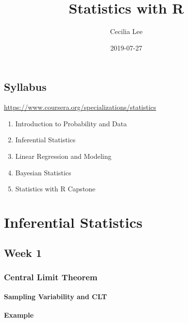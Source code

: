 \documentclass[]{book}
\title{Statistics with R}
\author{Cecilia Lee}
\date{2019-07-27}
\providecommand{\tightlist}{%
  \setlength{\itemsep}{0pt}\setlength{\parskip}{0pt}}
\begin{document}
\maketitle

{
\setcounter{tocdepth}{1}
\tableofcontents
}
\hypertarget{syllabus}{%
\chapter*{Syllabus}\label{syllabus}}

\url{https://www.coursera.org/specializations/statistics}

\begin{enumerate}
\def\labelenumi{\arabic{enumi}.}
\tightlist
\item
  Introduction to Probability and Data
\item
  Inferential Statistics
\item
  Linear Regression and Modeling
\item
  Bayesian Statistics
\item
  Statistics with R Capstone
\end{enumerate}

\hypertarget{part-inferential-statistics}{%
\part{Inferential Statistics}\label{part-inferential-statistics}}

\hypertarget{week-1}{%
\chapter*{Week 1}\label{week-1}}

\hypertarget{central-limit-theorem}{%
\section*{Central Limit Theorem}\label{central-limit-theorem}}

\hypertarget{sampling-variability-and-clt}{%
\subsection*{Sampling Variability and CLT}\label{sampling-variability-and-clt}}

\textbf{Example}
\end{document}
